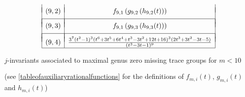 \begin{table}[!ht]
\[\begin{array}{|c|c|}
& \\ [-.75em]
(9,2) &  f_{9,1} \left( g_{9,2} \left( h_{9,2}(t) \right) \right) \\
& \\ [-.75em]
\hline
& \\ [-.75em]
(9,3) &  f_{9,1} \left( g_{9,3} \left( h_{9,3}(t) \right) \right) \\
& \\ [-.75em]
\hline
& \\ [-.75em]
 (9,4) &  \frac{3^7(t^2-1)^3(t^6 + 3t^5 + 6t^4 + t^3 - 3t^2 + 12t + 16)^3(2t^3 + 3t^2 - 3t - 5)}{(t^3 - 3t - 1)^9}\\
\hline 
\end{array}
\]

\vspace{.1in}
\caption{ $j$-invariants associated to maximal genus zero missing trace groups for $m < 10$}
\label{masterlistofjinvariants}
\begin{center}
(see \ref{tableofauxiliaryrationalfunctions} for the definitions of $f_{m,i}(t)$, $g_{m,i}(t)$ and $h_{m,i}(t)$)
\end{center}
\end{table}

